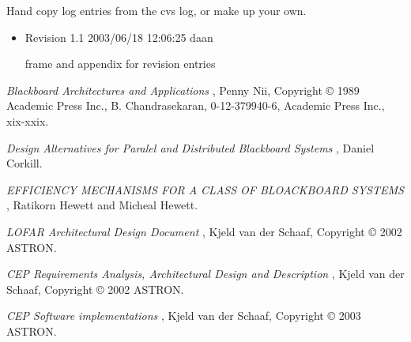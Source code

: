 \documentclass[]{lofar}
\begin{document}
  \label{revisionLog}\hypertarget{revisionLog}{}%

    Hand copy log entries from the cvs log, or make up your own.

    \begin{itemize}

      \item 

        Revision 1.1 2003/06/18 12:06:25 daan

        frame and appendix for revision entries

    \end{itemize}

  
  \begin{thebibliography}{WIDELABEL}

      \emph{Blackboard Architectures and Applications} ,
      Penny Nii,
      Copyright \copyright{} 1989 Academic Press Inc.,
      B. Chandrasekaran,
      0-12-379940-6,
      Academic Press Inc.,
      xix-xxix.
      \label{bib-nii}

      \emph{Design Alternatives for Paralel and Distributed Blackboard Systems} ,
      Daniel Corkill.
      \label{bib-Design-Alternatives}

      \emph{EFFICIENCY MECHANISMS FOR A CLASS OF BLOACKBOARD SYSTEMS} ,
      Ratikorn Hewett and Micheal Hewett.
      \label{bib-Efficiency}

      \emph{LOFAR Architectural Design Document} ,
      Kjeld van der Schaaf,
      Copyright \copyright{} 2002 ASTRON.
      \label{LOFAR-ASTRON-ADD-006}

      \emph{CEP Requirements Analysis, Architectural Design and
      Description} ,
      Kjeld van der Schaaf,
      Copyright \copyright{} 2002 ASTRON.
      \label{LOFAR-ASTRON-MEM-035}

      \emph{CEP Software implementations} ,
      Kjeld van der Schaaf,
      Copyright \copyright{} 2003 ASTRON.
      \label{PDR-CEP-Software}

  \end{thebibliography}

\end{document}
